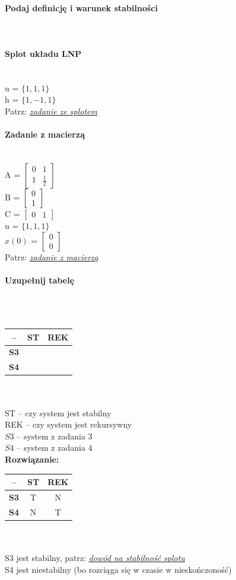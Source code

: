 \documentclass[12pt]{scrartcl}
\newcommand{\link}[2]{
	\hyperref[#1]{\textit{\underline{#2}}}
}
\newcommand{\myparagraph}[1]{\paragraph{#1}\mbox{}\\}
\newcommand{\macierz}[1]{\begin{bmatrix}#1\end{bmatrix}}
\begin{document}
\myparagraph{Podaj definicję i warunek stabilności}

\myparagraph{Splot układu LNP}
u = $\{1, 1, 1\}$\\
h = $\{1, -1, 1\}$\\

\noindent Patrz: \link{sec:splot}{zadanie ze splotem}

\myparagraph{Zadanie z macierzą}
A = $\macierz{0 & 1\\ 1 & \frac{1}{2}}$\\
B = $\macierz{0 \\ 1}$\\
C = $\macierz{0 & 1}$\\
u = $\{1, 1, 1\}$\\
$x(0)$ = $\macierz{0 \\ 0}$\\

\noindent Patrz: \link{sec:macierz}{zadanie z macierzą}\\


\myparagraph{Uzupełnij tabelę}\\
\begin{tabular}{|c|c|c|}
\hline
    \textbf{--} & \textbf{ST} & \textbf{REK} \\
 \hline
    \textbf{S3} & & \\
\hline
    \textbf{S4} & & \\
\hline
\end{tabular}\\\\
ST -- czy system jest stabilny\\
REK -- czy system jest rekursywny\\
$S3$ -- system z zadania 3\\
$S4$ -- system z zadania 4\\

\noindent
\textbf{Rozwiązanie:}\\
\begin{tabular}{|c|c|c|}
\hline
    \textbf{--} & \textbf{ST} & \textbf{REK} \\
 \hline
    \textbf{S3} & T & N \\
\hline
    \textbf{S4} & N & T \\
\hline
\end{tabular}\\
\\
S3 jest stabilny, patrz: \link{eq:stabilnoscsplotu}{dowód na stabilność splotu}\\
S4 jest niestabilny (bo rozciąga się w czasie w nieskończoność)
\end{document}
